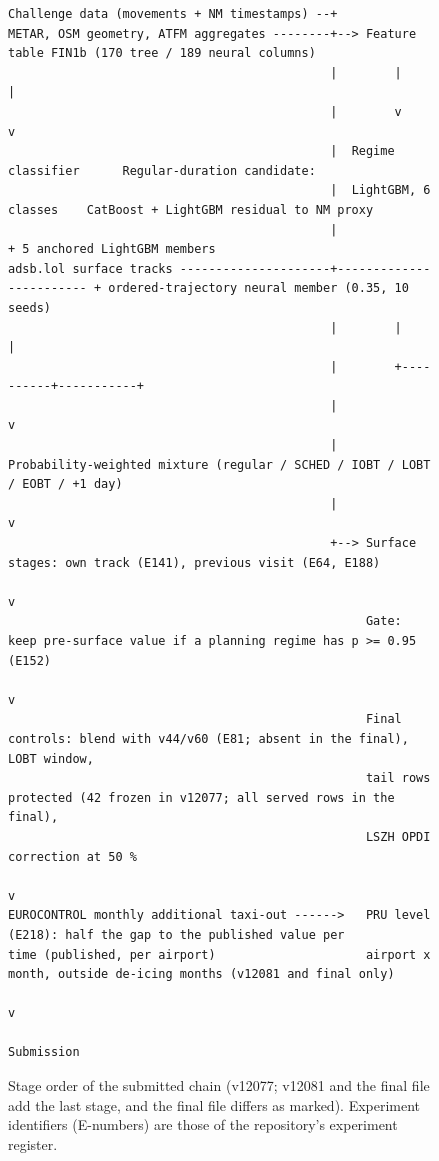 \documentclass[11pt,a4paper]{article}
\begin{document}
\begin{figure}[htbp]
\centering
{\scriptsize\begin{verbatim}
Challenge data (movements + NM timestamps) --+
METAR, OSM geometry, ATFM aggregates --------+--> Feature table FIN1b (170 tree / 189 neural columns)
                                             |        |                      |
                                             |        v                      v
                                             |  Regime classifier      Regular-duration candidate:
                                             |  LightGBM, 6 classes    CatBoost + LightGBM residual to NM proxy
                                             |                         + 5 anchored LightGBM members
adsb.lol surface tracks ---------------------+------------------------ + ordered-trajectory neural member (0.35, 10 seeds)
                                             |        |                      |
                                             |        +----------+-----------+
                                             |                   v
                                             |   Probability-weighted mixture (regular / SCHED / IOBT / LOBT / EOBT / +1 day)
                                             |                   v
                                             +--> Surface stages: own track (E141), previous visit (E64, E188)
                                                                 v
                                                  Gate: keep pre-surface value if a planning regime has p >= 0.95 (E152)
                                                                 v
                                                  Final controls: blend with v44/v60 (E81; absent in the final), LOBT window,
                                                  tail rows protected (42 frozen in v12077; all served rows in the final),
                                                  LSZH OPDI correction at 50 %
                                                                 v
EUROCONTROL monthly additional taxi-out ------>   PRU level (E218): half the gap to the published value per
time (published, per airport)                     airport x month, outside de-icing months (v12081 and final only)
                                                                 v
                                                             Submission
\end{verbatim}}
\caption{Stage order of the submitted chain (v12077; v12081 and the final file add the last stage, and the final file differs as marked). Experiment identifiers (E-numbers) are those of the repository's experiment register.}\label{fig:5}
\end{figure}
\end{document}
